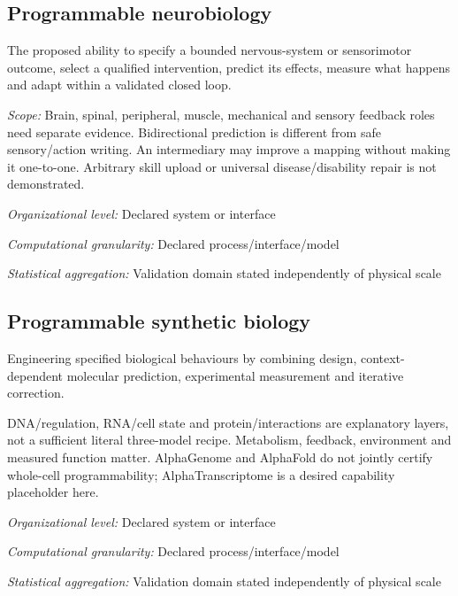 \begin{samepage}
\subsection*{Programmable neurobiology}
\noindent The proposed ability to specify a bounded nervous-system or sensorimotor outcome, select a qualified intervention, predict its effects, measure what happens and adapt within a validated closed loop.\par
\end{samepage}
\noindent\textit{Scope:} Brain, spinal, peripheral, muscle, mechanical and sensory feedback roles need separate evidence. Bidirectional prediction is different from safe sensory/action writing. An intermediary may improve a mapping without making it one-to-one. Arbitrary skill upload or universal disease/disability repair is not demonstrated.\par
\noindent\textit{Organizational level:} Declared system or interface\par
\noindent\textit{Computational granularity:} Declared process/interface/model\par
\noindent\textit{Statistical aggregation:} Validation domain stated independently of physical scale\par

\begin{samepage}
\subsection*{Programmable synthetic biology}
\noindent Engineering specified biological behaviours by combining design, context-dependent molecular prediction, experimental measurement and iterative correction.\par
\end{samepage}
\noindent DNA/regulation, RNA/cell state and protein/interactions are explanatory layers, not a sufficient literal three-model recipe. Metabolism, feedback, environment and measured function matter. AlphaGenome and AlphaFold do not jointly certify whole-cell programmability; AlphaTranscriptome is a desired capability placeholder here.\par
\noindent\textit{Organizational level:} Declared system or interface\par
\noindent\textit{Computational granularity:} Declared process/interface/model\par
\begin{samepage}
\noindent\textit{Statistical aggregation:} Validation domain stated independently of physical scale\par\nopagebreak[4]

\end{samepage}


